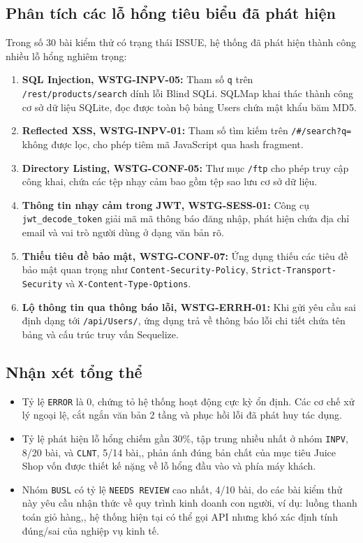 \subsection{Phân tích các lỗ hổng tiêu biểu đã phát hiện}
Trong số 30 bài kiểm thử có trạng thái ISSUE, hệ thống đã phát hiện thành công nhiều lỗ hổng nghiêm trọng:
\begin{enumerate}
    \item \textbf{SQL Injection, WSTG-INPV-05:} Tham số \texttt{q} trên \texttt{/rest/products/search} dính lỗi Blind SQLi. SQLMap khai thác thành công cơ sở dữ liệu SQLite, đọc được toàn bộ bảng Users chứa mật khẩu băm MD5.
    \item \textbf{Reflected XSS, WSTG-INPV-01:} Tham số tìm kiếm trên \texttt{/\#/search?q=} không được lọc, cho phép tiêm mã JavaScript qua hash fragment.
    \item \textbf{Directory Listing, WSTG-CONF-05:} Thư mục \texttt{/ftp} cho phép truy cập công khai, chứa các tệp nhạy cảm bao gồm tệp sao lưu cơ sở dữ liệu.
    \item \textbf{Thông tin nhạy cảm trong JWT, WSTG-SESS-01:} Công cụ \texttt{jwt\_decode\_token} giải mã mã thông báo đăng nhập, phát hiện chứa địa chỉ email và vai trò người dùng ở dạng văn bản rõ.
    \item \textbf{Thiếu tiêu đề bảo mật, WSTG-CONF-07:} Ứng dụng thiếu các tiêu đề bảo mật quan trọng như \texttt{Content-Security-Policy}, \texttt{Strict-Transport-Security} và \texttt{X-Content-Type-Options}.
    \item \textbf{Lộ thông tin qua thông báo lỗi, WSTG-ERRH-01:} Khi gửi yêu cầu sai định dạng tới \texttt{/api/Users/}, ứng dụng trả về thông báo lỗi chi tiết chứa tên bảng và cấu trúc truy vấn Sequelize.
\end{enumerate}

\subsection{Nhận xét tổng thể}
\begin{itemize}
    \item Tỷ lệ \texttt{ERROR} là 0, chứng tỏ hệ thống hoạt động cực kỳ ổn định. Các cơ chế xử lý ngoại lệ, cắt ngắn văn bản 2 tầng và phục hồi lỗi đã phát huy tác dụng.
    \item Tỷ lệ phát hiện lỗ hổng chiếm gần 30\%, tập trung nhiều nhất ở nhóm \texttt{INPV}, 8/20 bài, và \texttt{CLNT}, 5/14 bài,, phản ánh đúng bản chất của mục tiêu Juice Shop vốn được thiết kế nặng về lỗ hổng đầu vào và phía máy khách.
    \item Nhóm \texttt{BUSL} có tỷ lệ \texttt{NEEDS REVIEW} cao nhất, 4/10 bài, do các bài kiểm thử này yêu cầu nhận thức về quy trình kinh doanh con người, ví dụ: luồng thanh toán giỏ hàng,, hệ thống hiện tại có thể gọi API nhưng khó xác định tính đúng/sai của nghiệp vụ kinh tế.
\end{itemize}

